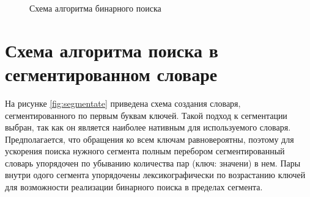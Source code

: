 \begin{figure}[h!]
	
	
	\caption{Схема алгоритма бинарного поиска}
	
	\label{fig:binary_search}
	
\end{figure}

\clearpage
\section{Схема алгоритма поиска в сегментированном словаре}

На рисунке \ref{fig:segmentate} приведена схема создания словаря, сегментированного по первым буквам ключей. Такой подход к сегментации выбран, так как он является наиболее нативным для используемого словаря. Предполагается, что обращения ко всем ключам равновероятны, поэтому для ускорения поиска нужного сегмента полным перебором сегментированный словарь упорядочен по убыванию количества пар (ключ: значени) в нем. Пары внутри одого сегмента упорядочены лексикографически по возрастанию ключей для возможности реализации бинарного поиска в пределах сегмента.

